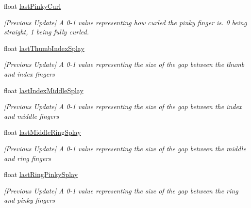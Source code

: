 \begin{DoxyCompactItemize}
float \mbox{\hyperlink{class_valve_1_1_v_r_1_1_steam_v_r___action___skeleton_ae5576991cce592c9e92f8ac5cc37dc5f}{last\+Pinky\+Curl}}
\begin{DoxyCompactList}\small\item\em \mbox{[}Previous Update\mbox{]} A 0-\/1 value representing how curled the pinky finger is. 0 being straight, 1 being fully curled. \end{DoxyCompactList}\item 
float \mbox{\hyperlink{class_valve_1_1_v_r_1_1_steam_v_r___action___skeleton_ac6fd8dcfc5104e14be27ebfa567d55b4}{last\+Thumb\+Index\+Splay}}
\begin{DoxyCompactList}\small\item\em \mbox{[}Previous Update\mbox{]} A 0-\/1 value representing the size of the gap between the thumb and index fingers \end{DoxyCompactList}\item 
float \mbox{\hyperlink{class_valve_1_1_v_r_1_1_steam_v_r___action___skeleton_a95ef4f48c69955e3fca33c609024be12}{last\+Index\+Middle\+Splay}}
\begin{DoxyCompactList}\small\item\em \mbox{[}Previous Update\mbox{]} A 0-\/1 value representing the size of the gap between the index and middle fingers \end{DoxyCompactList}\item 
float \mbox{\hyperlink{class_valve_1_1_v_r_1_1_steam_v_r___action___skeleton_aa55bbdea1fced05d7e6cf593ff25d24b}{last\+Middle\+Ring\+Splay}}
\begin{DoxyCompactList}\small\item\em \mbox{[}Previous Update\mbox{]} A 0-\/1 value representing the size of the gap between the middle and ring fingers \end{DoxyCompactList}\item 
float \mbox{\hyperlink{class_valve_1_1_v_r_1_1_steam_v_r___action___skeleton_a511f573a2ff1fc6f6f96255a3716a8f0}{last\+Ring\+Pinky\+Splay}}
\begin{DoxyCompactList}\small\item\em \mbox{[}Previous Update\mbox{]} A 0-\/1 value representing the size of the gap between the ring and pinky fingers \end{DoxyCompactList}\item 

\end{DoxyCompactItemize}

